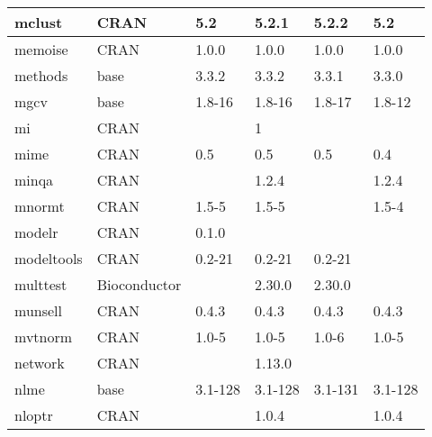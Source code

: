 \begin{longtable}{@{\extracolsep{\fill}}|l|l|l|l|l|l|@{}}
mclust                        & CRAN                      & 5.2         & 5.2.1       & 5.2.2          & 5.2              \\ \hline
memoise                       & CRAN                      & 1.0.0       & 1.0.0       & 1.0.0          & 1.0.0            \\ \hline
methods                       & base                      & 3.3.2       & 3.3.2       & 3.3.1          & 3.3.0            \\ \hline
mgcv                          & base                      & 1.8-16      & 1.8-16      & 1.8-17         & 1.8-12           \\ \hline
mi                            & CRAN                      &             & 1           &                &                  \\ \hline
mime                          & CRAN                      & 0.5         & 0.5         & 0.5            & 0.4              \\ \hline
minqa                         & CRAN                      &             & 1.2.4       &                & 1.2.4            \\ \hline
mnormt                        & CRAN                      & 1.5-5       & 1.5-5       &                & 1.5-4            \\ \hline
modelr                        & CRAN                      & 0.1.0       &             &                &                  \\ \hline
modeltools                    & CRAN                      & 0.2-21      & 0.2-21      & 0.2-21         &                  \\ \hline
multtest                      & Bioconductor              &             & 2.30.0      & 2.30.0         &                  \\ \hline
munsell                       & CRAN                      & 0.4.3       & 0.4.3       & 0.4.3          & 0.4.3            \\ \hline
mvtnorm                       & CRAN                      & 1.0-5       & 1.0-5       & 1.0-6          & 1.0-5            \\ \hline
network                       & CRAN                      &             & 1.13.0      &                &                  \\ \hline
nlme                          & base                      & 3.1-128     & 3.1-128     & 3.1-131        & 3.1-128          \\ \hline
nloptr                        & CRAN                      &             & 1.0.4       &                & 1.0.4            \\ \hline

\end{longtable}
